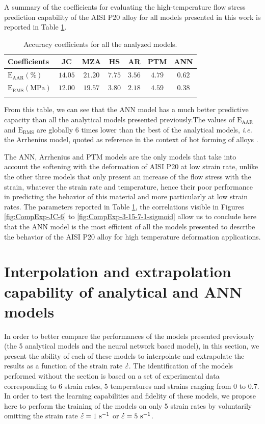 \documentclass[twoside,english,1p,final,sort&compress]{elsarticle}
\makeatletter
\theoremstyle{plain}
\DeclareRobustCommand{\mdot}[1]{\accentset{\mbox{\bfseries .}}{#1}}
\DeclareRobustCommand{\ie}{\emph{i.e.}\@\xspace}
\DeclareRobustCommand{\RMSE}{\text{E}_\text{RMS}}
\DeclareRobustCommand{\AARE}{\text{E}_\text{AAR}}
\DeclareRobustCommand{\ps}{\text{s}^{-1}}
\makeatother
\begin{document}
A summary of the coefficients for evaluating the high-temperature flow stress prediction capability of the AISI P20 alloy for all models presented in this work is reported in Table \ref{tab:Errors}.
\begin{table}[h!]
\centering
\caption{Accuracy coefficients for all the analyzed models.}
\begin{tabular}{lcccccc}
\hline
Coefficients & JC & MZA & HS & AR & PTM & ANN\\
\hline
$\AARE(\%)$ & $14.05$ & $21.20$ & $7.75$ & $3.56$ & $4.79$ & $0.62$\\
$\RMSE(\text{MPa})$ & $12.00$ & $19.57$ & $3.80$ & $2.18$ & $4.59$ & $0.38$\\
\hline
\label{tab:Errors}
\end{tabular}
\end{table}
From this table, we can see that the ANN model has a much better predictive capacity than all the analytical models presented previously.The values of $\AARE$ and $\RMSE$ are globally 6 times lower than the best of the analytical models, \ie the Arrhenius model, quoted as reference in the context of hot forming of alloys \cite{Liang-2022}.

The ANN, Arrhenius and PTM models are the only models that take into account the softening with the deformation of AISI P20 at low strain rate, unlike the other three models that only present an increase of the flow stress with the strain, whatever the strain rate and temperature, hence their poor performance in predicting the behavior of this material and more particularly at low strain rates.
The parameters reported in Table \ref{tab:Errors}, the correlations visible in Figures \ref{fig:CompExp-JC-6} to \ref{fig:CompExp-3-15-7-1-sigmoid} allow us to conclude here that the ANN model is the most efficient of all the models presented to describe the behavior of the AISI P20 alloy for high temperature deformation applications.

\section{Interpolation and extrapolation capability of analytical and ANN models \label{sec:IntExt}}

In order to better compare the performances of the models presented previously (the 5 analytical models and the neural network based model), in this section, we present the ability of each of these models to interpolate and extrapolate the results as a function of the strain rate $\mdot\varepsilon$.
The identification of the models performed without the section is based on a set of experimental data corresponding to 6 strain rates, 5 temperatures and strains ranging from $0$ to $0.7$.
In order to test the learning capabilities and fidelity of these models, we propose here to perform the training of the models on only 5 strain rates by voluntarily omitting the strain rate $\mdot\varepsilon=1~\ps$ or $\mdot\varepsilon=5~\ps$.
\end{document}
